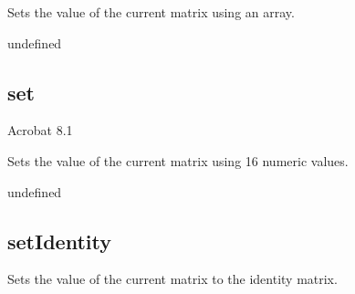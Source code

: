 \documentclass[letterpaper,12pt,english,openany,oneside]{sphinxmanual}
\begin{document}
Sets the value of the current matrix using an array.

\label{\detokenize{JS_3D_API:syntax-56}}

\begin{sphinxVerbatim}[commandchars=\\\{\}]
  
\end{sphinxVerbatim}
\label{\detokenize{JS_3D_API:parameters-43}}

\label{\detokenize{JS_3D_API:section-62}}\label{\detokenize{JS_3D_API:returns-57}}

undefined


\subsection{set}
\label{\detokenize{JS_3D_API:set-4}}\label{\detokenize{JS_3D_API:id15}}
Acrobat 8.1

Sets the value of the current matrix using 16 numeric values.

\label{\detokenize{JS_3D_API:syntax-57}}

\begin{sphinxVerbatim}[commandchars=\\\{\}]
               
\end{sphinxVerbatim}
\label{\detokenize{JS_3D_API:parameters-44}}

\label{\detokenize{JS_3D_API:section-63}}\label{\detokenize{JS_3D_API:returns-58}}

undefined


\subsection{setIdentity}
\label{\detokenize{JS_3D_API:setidentity}}
Sets the value of the current matrix to the identity matrix.
\end{document}
